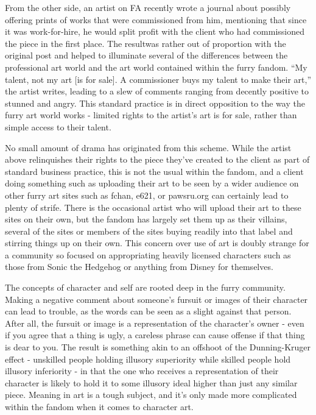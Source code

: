 From the other side, an artist on FA recently wrote a journal about possibly offering prints of works that were commissioned from him, mentioning that since it was work-for-hire, he would split profit with the client who had commissioned the piece in the first place. The resultwas rather out of proportion with the original post and helped to illuminate several of the differences between the professional art world and the art world contained within the furry fandom. ``My talent, not my art {[}is for sale{]}. A commissioner buys my talent to make their art,'' the artist writes, leading to a slew of comments ranging from decently positive to stunned and angry. This standard practice is in direct opposition to the way the furry art world works - limited rights to the artist's art is for sale, rather than simple access to their talent.

No small amount of drama has originated from this scheme. While the artist above relinquishes their rights to the piece they've created to the client as part of standard business practice, this is not the usual within the fandom, and a client doing something such as uploading their art to be seen by a wider audience on other furry art sites such as fchan, e621, or pawsru.org can certainly lead to plenty of strife. There is the occasional artist who will upload their art to these sites on their own, but the fandom has largely set them up as their villains, several of the sites or members of the sites buying readily into that label and stirring things up on their own. This concern over use of art is doubly strange for a community so focused on appropriating heavily licensed characters such as those from Sonic the Hedgehog or anything from Disney for themselves.

The concepts of character and self are rooted deep in the furry community. Making a negative comment about someone's fursuit or images of their character can lead to trouble, as the words can be seen as a slight against that person. After all, the fursuit or image is a representation of the character's owner - even if you agree that a thing is ugly, a careless phrase can cause offense if that thing is dear to you. The result is something akin to an offshoot of the Dunning-Kruger effect - unskilled people holding illusory superiority while skilled people hold illusory inferiority - in that the one who receives a representation of their character is likely to hold it to some illusory ideal higher than just any similar piece. Meaning in art is a tough subject, and it's only made more complicated within the fandom when it comes to character art.

